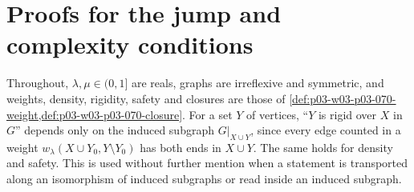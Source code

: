 \section{Proofs for the jump and complexity conditions}
\label{sec:annex-p03-w03-p03-070}

Throughout, \(\lambda,\mu\in(0,1]\) are reals, graphs are irreflexive and
symmetric, and weights, density, rigidity, safety and closures are those of
\cref{def:p03-w03-p03-070-weight,def:p03-w03-p03-070-closure}.  For a set
\(Y\) of vertices, ``\(Y\) is rigid over \(X\) in \(G\)'' depends only on the
induced subgraph \(G|_{X\cup Y}\), since every edge counted in a weight
\(w_\lambda(X\cup Y_0,Y\setminus Y_0)\) has both ends in \(X\cup Y\).  The
same holds for density and safety.  This is used without further mention
when a statement is transported along an isomorphism of induced subgraphs or
read inside an induced subgraph.

